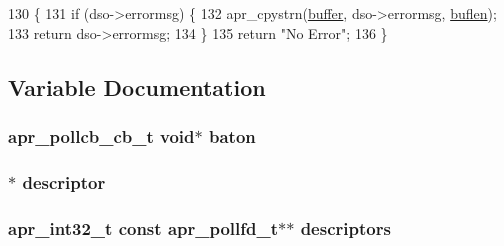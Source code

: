 \begin{DoxyCode}
130 \{
131     \textcolor{keywordflow}{if} (dso->errormsg) \{
132         apr\_cpystrn(\hyperlink{group__APACHE__CORE__PROTO_gabd91b1aab0a10c5027ca2eb5577f759f}{buffer}, dso->errormsg, \hyperlink{group__APACHE__CORE__DAEMON_ga71e9cfb174fb4be19396f3f3d1b25bee}{buflen});
133         \textcolor{keywordflow}{return} dso->errormsg;
134     \}
135     \textcolor{keywordflow}{return} \textcolor{stringliteral}{"No Error"};
136 \}
\end{DoxyCode}


\subsection{Variable Documentation}
\subsubsection[{\texorpdfstring{baton}{baton}}]{ {\bf apr\+\_\+pollcb\+\_\+cb\+\_\+t} {\bf void}$\ast$ baton}\hypertarget{group__apr__poll_gafbe19e45631d6f40a439f57b08f7740c}{}\label{group__apr__poll_gafbe19e45631d6f40a439f57b08f7740c}
\subsubsection[{\texorpdfstring{descriptor}{descriptor}}]{ $\ast$ descriptor}\hypertarget{group__apr__poll_ga93f9312d40401caaec1865013fe2bf61}{}\label{group__apr__poll_ga93f9312d40401caaec1865013fe2bf61}
\subsubsection[{\texorpdfstring{descriptors}{descriptors}}]{ {\bf apr\+\_\+int32\+\_\+t} const {\bf apr\+\_\+pollfd\+\_\+t}$\ast$$\ast$ descriptors}\hypertarget{group__apr__poll_ga79b31f5f6b249ca41dcc8a49b8fd5aa9}{}\label{group__apr__poll_ga79b31f5f6b249ca41dcc8a49b8fd5aa9}

